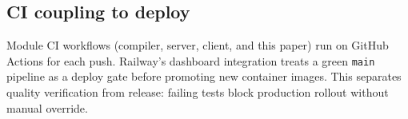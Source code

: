 \subsection{CI coupling to deploy}\label{subsec:ci-deploy-gate}

Module CI workflows (compiler, server, client, and this paper) run on GitHub Actions for each push.
Railway's dashboard integration treats a green \texttt{main} pipeline as a deploy gate before promoting new container
images.
This separates quality verification from release: failing tests block production rollout without manual override.
